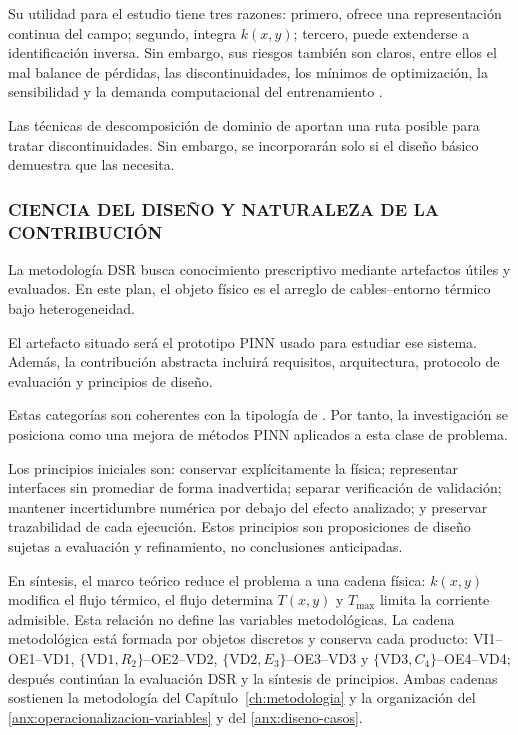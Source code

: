 \documentclass[11pt,a4paper,oneside]{report}
\newcommand{\Tmax}{T_{\max}}
\newcommand{\kx}{k(x,y)}
\begin{document}
Su utilidad para el estudio tiene tres razones: primero, ofrece una representación continua del campo; segundo, integra $\kx$; tercero, puede extenderse a identificación inversa. Sin embargo, sus riesgos también son claros, entre ellos el mal balance de pérdidas, las discontinuidades, los mínimos de optimización, la sensibilidad y la demanda computacional del entrenamiento \parencites[2--6]{ren2025}[16]{pan2025}.

Las técnicas de descomposición de dominio de \textcite[1--2]{shukla2021} aportan una ruta posible para tratar discontinuidades. Sin embargo, se incorporarán solo si el diseño básico demuestra que las necesita.

\subsubsection{CIENCIA DEL DISEÑO Y NATURALEZA DE LA CONTRIBUCIÓN}
\label{subsec:dsr-contribucion}

La metodología DSR busca conocimiento prescriptivo mediante artefactos útiles y evaluados. En este plan, el objeto físico es el arreglo de cables--entorno térmico bajo heterogeneidad.

El artefacto situado será el prototipo PINN usado para estudiar ese sistema. Además, la contribución abstracta incluirá requisitos, arquitectura, protocolo de evaluación y principios de diseño.

Estas categorías son coherentes con la tipología de \textcite[343--349]{gregor2013}. Por tanto, la investigación se posiciona como una mejora de métodos PINN aplicados a esta clase de problema.

Los principios iniciales son: conservar explícitamente la física; representar interfaces sin promediar de forma inadvertida; separar verificación de validación; mantener incertidumbre numérica por debajo del efecto analizado; y preservar trazabilidad de cada ejecución. Estos principios son proposiciones de diseño sujetas a evaluación y refinamiento, no conclusiones anticipadas.

En síntesis, el marco teórico reduce el problema a una cadena física: $\kx$ modifica el flujo térmico, el flujo determina $T(x,y)$ y $\Tmax$ limita la corriente admisible. Esta relación no define las variables metodológicas. La cadena metodológica está formada por objetos discretos y conserva cada producto: VI1--OE1--VD1, $\{\mathrm{VD1},R_2\}$--OE2--VD2, $\{\mathrm{VD2},E_3\}$--OE3--VD3 y $\{\mathrm{VD3},C_4\}$--OE4--VD4; después continúan la evaluación DSR y la síntesis de principios. Ambas cadenas sostienen la metodología del Capítulo~\ref{ch:metodologia} y la organización del \ref{anx:operacionalizacion-variables} y del \ref{anx:diseno-casos}.
\end{document}
